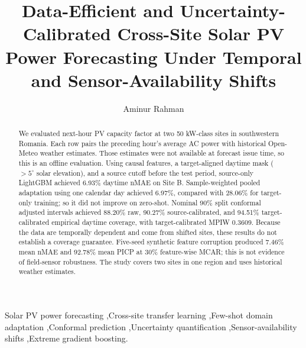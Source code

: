 \documentclass[preprint,12pt,authoryear]{elsarticle}
\begin{document}
\begin{frontmatter}

\title{Data-Efficient and Uncertainty-Calibrated Cross-Site Solar PV Power Forecasting Under Temporal and Sensor-Availability Shifts}

\author[inst1]{Aminur Rahman}


\begin{abstract}
We evaluated next-hour PV capacity factor at two 50 kW-class sites in southwestern Romania. Each row pairs the preceding hour’s average AC power with historical Open-Meteo weather estimates. Those estimates were not available at forecast issue time, so this is an offline evaluation. Using causal features, a target-aligned daytime mask ($>5^\circ$ solar elevation), and a source cutoff before the test period, source-only LightGBM achieved 6.93\% daytime nMAE on Site B. Sample-weighted pooled adaptation using one calendar day achieved 6.97\%, compared with 28.06\% for target-only training; so it did not improve on zero-shot. Nominal 90\% split conformal adjusted intervals achieved 88.20\% raw, 90.27\% source-calibrated, and 94.51\% target-calibrated empirical daytime coverage, with target-calibrated MPIW 0.3609. Because the data are temporally dependent and come from shifted sites, these results do not establish a coverage guarantee. Five-seed synthetic feature corruption produced 7.46\% mean nMAE and 92.78\% mean PICP at 30\% feature-wise MCAR; this is not evidence of field-sensor robustness. The study covers two sites in one region and uses historical weather estimates.
\end{abstract}

\begin{keyword}
Solar PV power forecasting \sep Cross-site transfer learning \sep Few-shot domain adaptation \sep Conformal prediction \sep Uncertainty quantification \sep Sensor-availability shifts \sep Extreme gradient boosting.
\end{keyword}

\end{frontmatter}
\end{document}
